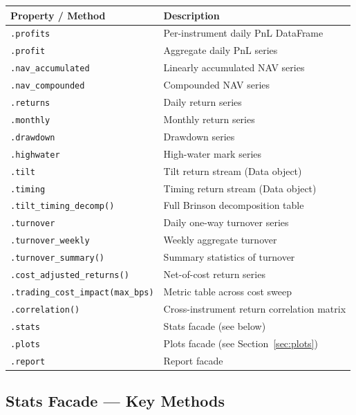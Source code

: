 \documentclass[11pt,a4paper]{article}
\begin{document}
\begin{longtable}{@{}p{5.5cm}p{8.5cm}@{}}
\toprule
Property / Method & Description \\
\midrule
\endhead
\texttt{.profits} & Per-instrument daily PnL DataFrame \\
\texttt{.profit} & Aggregate daily PnL series \\
\texttt{.nav\_accumulated} & Linearly accumulated NAV series \\
\texttt{.nav\_compounded} & Compounded NAV series \\
\texttt{.returns} & Daily return series \\
\texttt{.monthly} & Monthly return series \\
\texttt{.drawdown} & Drawdown series \\
\texttt{.highwater} & High-water mark series \\
\texttt{.tilt} & Tilt return stream (Data object) \\
\texttt{.timing} & Timing return stream (Data object) \\
\texttt{.tilt\_timing\_decomp()} & Full Brinson decomposition table \\
\texttt{.turnover} & Daily one-way turnover series \\
\texttt{.turnover\_weekly} & Weekly aggregate turnover \\
\texttt{.turnover\_summary()} & Summary statistics of turnover \\
\texttt{.cost\_adjusted\_returns()} & Net-of-cost return series \\
\texttt{.trading\_cost\_impact(max\_bps)} & Metric table across cost sweep \\
\texttt{.correlation()} & Cross-instrument return correlation matrix \\
\texttt{.stats} & Stats facade (see below) \\
\texttt{.plots} & Plots facade (see Section~\ref{sec:plots}) \\
\texttt{.report} & Report facade \\
\bottomrule
\end{longtable}

\subsection{Stats Facade — Key Methods}
\end{document}
